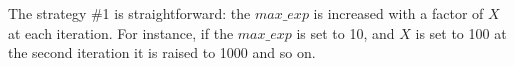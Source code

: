 
The strategy \#1 is straightforward: the $max\_exp$ is increased with a factor of $X$ at each iteration. For instance, if the $max\_exp$ is set to 10, and $X$ is set to 100 at the second iteration it is raised to 1000 and so on. 


